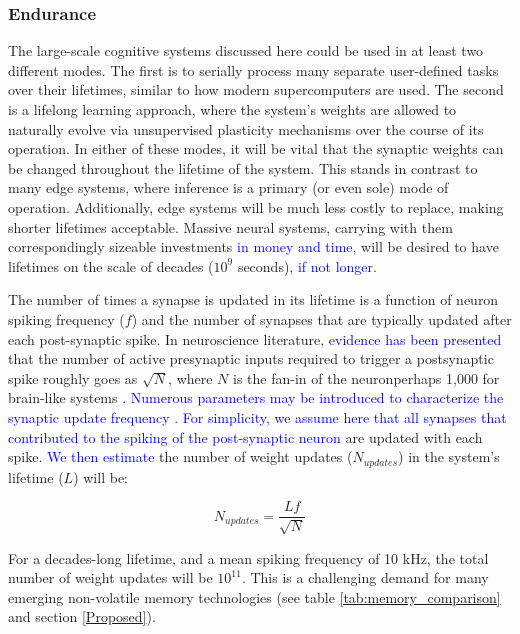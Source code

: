 \documentclass[twocolumn]{article}
\begin{document}
\subsubsection{Endurance}
The large-scale cognitive systems discussed here could be used in at least two different modes. The first is to serially process many separate user-defined tasks over their lifetimes, similar to how modern supercomputers are used. The second is a lifelong learning approach, where the system's weights are allowed to naturally evolve via unsupervised plasticity mechanisms over the course of its operation. In either of these modes, it will be vital that the synaptic weights can be changed throughout the lifetime of the system. This stands in contrast to many edge systems, where inference is a primary (or even sole) mode of operation. Additionally, edge systems will be much less costly to replace, making shorter lifetimes acceptable. Massive neural systems, carrying with them correspondingly sizeable investments \textcolor{blue}{in money and time}, will be desired to have lifetimes on the scale of decades ($10^9$ seconds)\textcolor{blue}{, if not longer}.

The number of times a synapse is updated in its lifetime is a function of neuron spiking frequency ($f$) and the number of synapses that are typically updated after each post-synaptic spike. In neuroscience literature, \textcolor{blue}{evidence has been presented} that the number of active presynaptic inputs required to trigger a postsynaptic spike roughly goes as $\sqrt{N}$, where $N$ is the fan-in of the neuron\textemdash perhaps 1,000 for brain-like systems \cite{vrso1996,vora2005}. \textcolor{blue}{Numerous parameters may be introduced to characterize the synaptic update frequency \cite{fuab2007}. For simplicity, we assume here that all synapses that contributed to the spiking of the post-synaptic neuron} are updated with each spike. \textcolor{blue}{We then estimate} the number of weight updates ($N_{updates}$) in the system's lifetime ($L$) will be:

\begin{equation}
    N_{updates} = \frac{Lf}{\sqrt{N}}
\end{equation}

For a decades-long lifetime, and a mean spiking frequency of 10 kHz, the total number of weight updates will be $10^{11}$. This is a challenging demand for many emerging non-volatile memory technologies (see table \ref{tab:memory_comparison} and section \ref{Proposed}).
\end{document}
